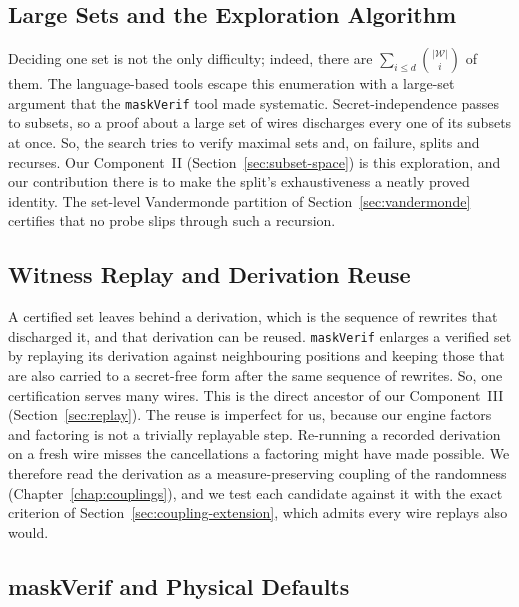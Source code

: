  \subsection{Large Sets and the Exploration Algorithm}
  \label{sec:related-largesets}

  Deciding one set is not the only difficulty; indeed, there are
  $\sum_{i \le d} \binom{|\mathcal{W}|}{i}$ of them. The language-based tools escape
  this enumeration with a large-set argument that the \texttt{maskVerif} tool
  \parencite{10.1007/978-3-030-29959-0_15} made systematic. Secret-independence
  passes to subsets, so a proof about a large set of wires discharges every
  one of its subsets at once. So, the search tries to verify maximal sets and, on failure,
  splits and recurses. Our Component~II
  (Section~\ref{sec:subset-space}) is this exploration, and our contribution there
  is to make the split's exhaustiveness a neatly proved identity. The set-level
  Vandermonde partition of Section~\ref{sec:vandermonde} certifies that no probe
  slips through such a recursion.

  \subsection{Witness Replay and Derivation Reuse}
  \label{sec:related-replay}

  A certified set leaves behind a derivation, which is the sequence of rewrites that
  discharged it, and that derivation can be reused. \texttt{maskVerif}
  \parencite{10.1007/978-3-030-29959-0_15} enlarges a verified set by replaying its
  derivation against neighbouring positions and keeping those that are also carried to a
  secret-free form after the same sequence of rewrites.
  So, one certification serves many wires. This is the direct
  ancestor of our Component~III (Section~\ref{sec:replay}). The reuse is imperfect
  for us, because our engine factors and factoring is not a trivially replayable step. Re-running
  a recorded derivation on a fresh wire misses the cancellations a factoring might have
  made possible. We therefore read the derivation as a
  measure-preserving coupling of the randomness (Chapter~\ref{chap:couplings}), and
  we test each candidate against it with the exact criterion of
  Section~\ref{sec:coupling-extension}, which admits every wire replays also would.

  \subsection{maskVerif and Physical Defaults}
  \label{sec:related-maskverif}

